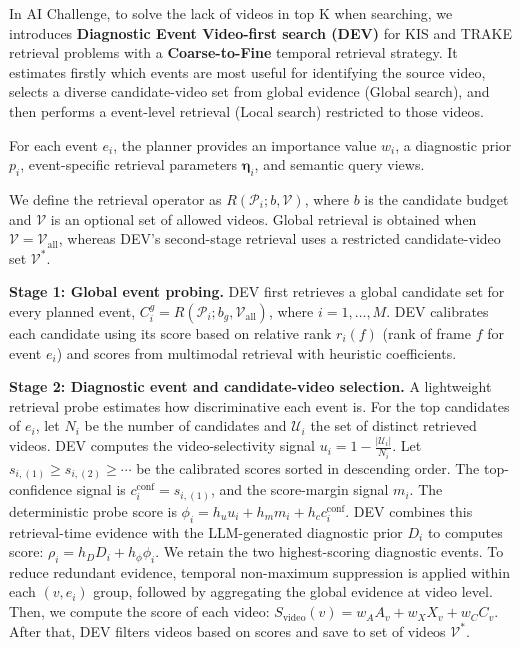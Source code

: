 \documentclass[runningheads]{llncs}
\begin{document}
In AI Challenge, to solve the lack of videos in top K when searching, we introduces \textbf{Diagnostic Event Video-first search (DEV)} for KIS and TRAKE retrieval problems with a \textbf{Coarse-to-Fine} temporal retrieval strategy. It estimates firstly which events are most useful for identifying the
source video, selects a diverse candidate-video set from global evidence (Global search), and
then performs a event-level retrieval (Local search) restricted to those videos.

For each event $e_i$, the planner provides an importance value $w_i$, a
diagnostic prior $p_i$, event-specific retrieval parameters
$\boldsymbol{\eta}_i$, and semantic query views.

We define the retrieval operator as $R(\mathcal{P}_i;b,\mathcal{V})$, where $b$ is the candidate budget and $\mathcal{V}$ is an optional set of
allowed videos. Global retrieval is obtained when
$\mathcal{V}=\mathcal{V}_{\mathrm{all}}$, whereas DEV's second-stage retrieval
uses a restricted candidate-video set $\mathcal{V}^{*}$.

\textbf{Stage 1: Global event probing.} 
DEV first retrieves a global candidate set for every planned event,
$
C_i^{g}
=
R(\mathcal{P}_i;b_g,\mathcal{V}_{\mathrm{all}})$, where $i=1,\ldots,M$. DEV calibrates each candidate using its score based on relative rank $r_i(f)$ (rank of frame $f$ for event $e_i$) and scores from multimodal retrieval with heuristic coefficients.

\textbf{Stage 2: Diagnostic event and candidate-video selection.}
A lightweight retrieval probe estimates how discriminative each event is.
For the top candidates of $e_i$, let $N_i$ be the number of candidates and
$\mathcal{U}_i$ the set of distinct retrieved videos. DEV computes the
video-selectivity signal $
u_i
=
1-\frac{|\mathcal{U}_i|}{N_i}
$. Let $s_{i,(1)}\geq s_{i,(2)}\geq\cdots$ be the calibrated scores sorted in descending order. The top-confidence signal
is $c_i^{\mathrm{conf}}=s_{i,(1)}$, and the score-margin signal $m_i$. The deterministic probe score is $
\phi_i
=
h_u u_i
+
h_m m_i
+
h_c c_i^{\mathrm{conf}}
$. DEV combines this retrieval-time evidence with the LLM-generated diagnostic prior $D_i$ to computes score:
$\rho_i
=
h_D D_i+h_{\phi}\phi_i$. We retain the two highest-scoring diagnostic events. To reduce redundant evidence, temporal non-maximum suppression is applied
within each $(v,e_i)$ group, followed by aggregating the global evidence at video level. Then, we compute the score of each video: $S_{\mathrm{video}}(v)
= 
w_A A_v
+
w_X X_v
+
w_C C_v$.
\label{eq:dev_video_score}After that, DEV filters videos based on scores and save to set of videos $\mathcal{V}^{*}$.
\end{document}
